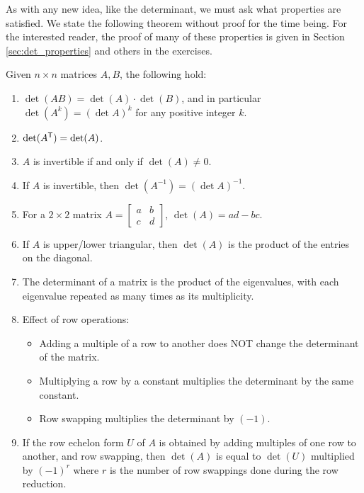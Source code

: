 As with any new idea, like the determinant, we must ask what properties are satisfied. We state the following theorem without proof for the time being. For the interested reader, the proof of many of these properties is given in Section \ref{sec:det_properties} and others in the exercises. 


\begin{theorem} \label{thm:determinant_properties} Given $n\times n$ matrices $A, B$, the following hold:

\begin{enumerate}

\item $\det (AB) = \det (A) \cdot \det (B)$, and in particular $\det
(A^k) = (\det A)^k$ for any positive integer $k$.
\item $\det (A^{\mathsf{T}}) = \det (A)$.
\item $A$ is invertible if and only if $\det (A) \neq 0$.
\item If $A$ is invertible, then $\det (A^{-1}) = (\det A)^{-1}$.
\item For a $2\times 2$ matrix $A=\begin{bmatrix} a & b \\ c & d
\end{bmatrix}$, $\det (A) = ad-bc$.
\item If $A$ is upper/lower triangular, then $\det (A)$ is the product
of the entries on the diagonal.
\item The determinant of a matrix is the product of the eigenvalues,
with each eigenvalue repeated as many times as its multiplicity.
\item Effect of row operations:
\begin{itemize}
\item Adding a multiple of a row to another does NOT change the
determinant of the matrix.
\item Multiplying a row by a constant multiplies the determinant by
the same constant.
\item Row swapping multiplies the determinant by $(-1)$.
\end{itemize}
\item If the row echelon form $U$ of $A$ is obtained by adding
multiples of one row to another, and row swapping, then $\det (A)$ is
equal to $\det (U)$ multiplied by $(-1)^r$ where $r$ is the number of row
swappings done during the row reduction.
\end{enumerate}
\end{theorem}

